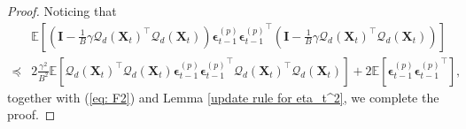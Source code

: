 \documentclass[11pt, letterpaper]{article}
\begin{document}
\begin{proof}
    Noticing that
    \begin{equation}
        \label{eq: F3}
        \begin{aligned}
            &\mathbb{E}\left[\left(\mathbf{I}-\frac{1}{B}\gamma {\mathcal{Q}_d(\mathbf{X}_t)}^\top \mathcal{Q}_d(\mathbf{X}_t)\right)\boldsymbol{\epsilon}_{t-1}^{(p)}{\boldsymbol{\epsilon}_{t-1}^{(p)}}^\top\left(\mathbf{I}-\frac{1}{B}\gamma {\mathcal{Q}_d(\mathbf{X}_t)}^\top \mathcal{Q}_d(\mathbf{X}_t)\right)\right]\\
            \preceq&2\frac{\gamma^2}{B^2}\mathbb{E}\left[{\mathcal{Q}_d(\mathbf{X}_t)}^\top {\mathcal{Q}_d(\mathbf{X}_t)}\boldsymbol{\epsilon}_{t-1}^{(p)}{\boldsymbol{\epsilon}_{t-1}^{(p)}}^\top {\mathcal{Q}_d(\mathbf{X}_t)}^\top\mathcal{Q}_d(\mathbf{X}_t)\right]+2\mathbb{E}\left[\boldsymbol{\epsilon}_{t-1}^{(p)}{\boldsymbol{\epsilon}_{t-1}^{(p)}}^\top\right],
        \end{aligned}
    \end{equation}
    together with (\ref{eq: F2}) and Lemma \ref{update rule for eta_t^2}, we complete the proof.
\end{proof}
\end{document}

